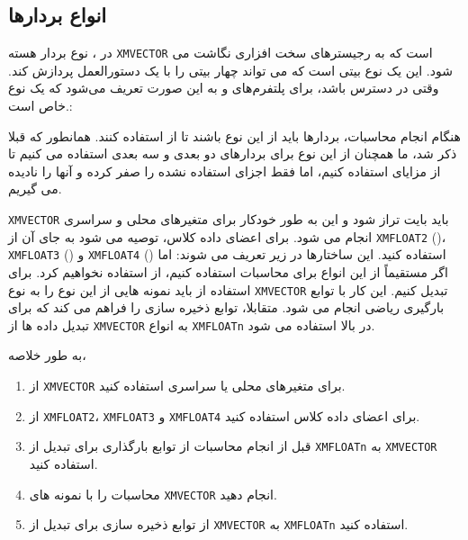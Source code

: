 \subsection{\textbf{انواع بردارها}}
\label{subsec:1.6.1}
{
    \Large
    \begin{spacing}{1.5}
        در ، نوع بردار هسته \texttt{XMVECTOR} است که به رجیسترهای سخت افزاری  نگاشت می شود.
        این یک نوع  بیتی است که می تواند چهار   بیتی را با یک دستورالعمل  پردازش کند.
        وقتی  در دسترس باشد، برای پلتفرم‌های  و  به این صورت تعریف می‌شود که  یک نوع  خاص است.:

        \begin{flushleft}
        \end{flushleft}

        هنگام انجام محاسبات، بردارها باید از این نوع باشند تا از  استفاده کنند.
        همانطور که قبلا ذکر شد، ما همچنان از این نوع برای بردارهای دو بعدی و سه بعدی استفاده می کنیم تا از مزایای  استفاده کنیم،
        اما فقط اجزای استفاده نشده را صفر کرده و آنها را نادیده می گیریم.

        \texttt{XMVECTOR} باید  بایت تراز شود و این به طور خودکار برای متغیرهای محلی و سراسری انجام می شود.
        برای اعضای داده کلاس، توصیه می شود به جای آن از \texttt{XMFLOAT2} ()، \texttt{XMFLOAT3} () و \texttt{XMFLOAT4} () استفاده کنید. این ساختارها در زیر تعریف می شوند:
        \textbf{\vspace{6pt}}
        \lr{}
        \textbf{\vspace{6pt}}
        اما اگر مستقیماً از این انواع برای محاسبات استفاده کنیم، از  استفاده نخواهیم کرد.
        برای استفاده از  باید نمونه هایی از این نوع را به نوع \texttt{XMVECTOR} تبدیل کنیم.
        این کار با توابع بارگیری ریاضی  انجام می شود.
        متقابلا،  توابع ذخیره سازی را فراهم می کند که برای تبدیل داده ها از \texttt{XMVECTOR} به انواع \texttt{XMFLOATn} در بالا استفاده می شود.

        به طور خلاصه،

        \begin{enumerate}[label=\textbf{\arabic*}.]
            \item {از \texttt{XMVECTOR} برای متغیرهای محلی یا سراسری استفاده کنید.}
            \item {از \texttt{XMFLOAT2}، \texttt{XMFLOAT3} و \texttt{XMFLOAT4} برای اعضای داده کلاس استفاده کنید.}
            \item {قبل از انجام محاسبات از توابع بارگذاری برای تبدیل از \texttt{XMFLOATn} به \texttt{XMVECTOR} استفاده کنید.}
            \item {محاسبات را با نمونه های \texttt{XMVECTOR} انجام دهید.}
            \item {از توابع ذخیره سازی برای تبدیل از \texttt{XMVECTOR} به \texttt{XMFLOATn} استفاده کنید.}
        \end{enumerate}
    \end{spacing}
}

